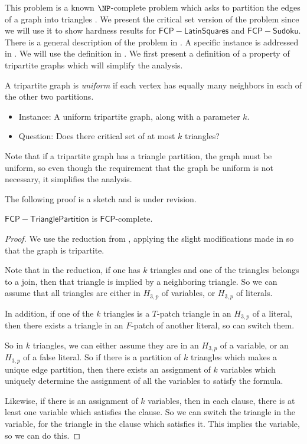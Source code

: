 \documentclass[runningheads,a4paper]{llncs}
\begin{document}
This problem is a known $\NP$-complete problem which asks to partition the edges of a graph into triangles \cite{holyer1981np}. We present the critical set version of the problem since we will use it to show hardness results for $\mathsf{FCP-Latin Squares}$ and $\mathsf{FCP-Sudoku}$. There is a general description of the problem in \cite{holyer1981np}. A specific instance is addressed in \cite{colbourn1984complexity}. We will use the definition in \cite{colbourn1984complexity}. We first present a definition of a property of tripartite graphs which will simplify the analysis.

\begin{definition}
A tripartite graph is \emph{uniform} if each vertex has equally many neighbors in each of the other two partitions.
\end{definition}

\begin{itemize}
\item Instance: A uniform tripartite graph, along with a parameter $k$.
\item Question: Does there critical set of at most $k$ triangles?
\end{itemize}

Note that if a tripartite graph has a triangle partition, the graph must be uniform, so even though the requirement that the graph be uniform is not necessary, it simplifies the analysis.

The following proof is a sketch and is under revision.

\begin{theorem}
$\mathsf{FCP-Triangle Partition}$ is $\mathsf{FCP}$-complete.
\end{theorem}

\begin{proof}
We use the reduction from \cite{holyer1981np}, applying the slight modifications made in \cite{colbourn1984complexity} so that the graph is tripartite. 

Note that in the reduction, if one has $k$ triangles and one of the triangles belongs to a join, then that triangle is implied by a neighboring triangle. So we can assume that all triangles are either in $H_{3,p}$ of variables, or $H_{3,p}$ of literals. 

In addition, if one of the $k$ triangles is a $T$-patch triangle in an $H_{3,p}$ of a literal, then there exists a triangle in an $F$-patch of another literal, so can switch them.

So in $k$ triangles, we can either assume they are in an $H_{3,p}$ of a variable, or an $H_{3,p}$ of a false literal. So if there is a partition of $k$ triangles which makes a unique edge partition, then there exists an assignment of $k$ variables which uniquely determine the assignment of all the variables to satisfy the formula. 

Likewise, if there is an assignment of $k$ variables, then in each clause, there is at least one variable which satisfies the clause. So we can switch the triangle in the variable, for the triangle in the clause which satisfies it. This implies the variable, so we can do this.
\end{proof}
\end{document}
